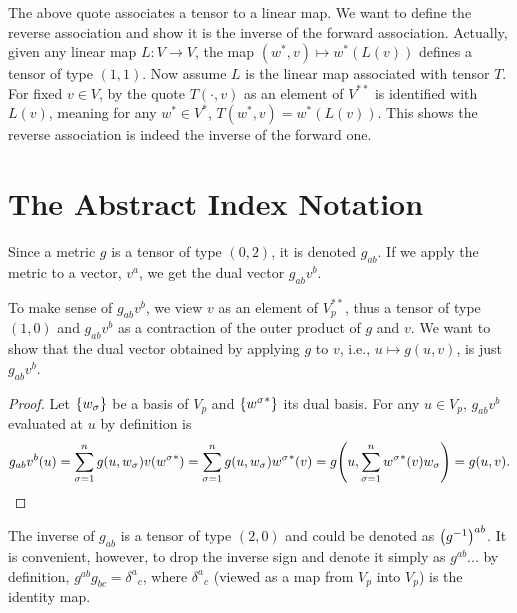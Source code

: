 \documentclass{note}
\numberwithin{equation}{chapter}
\begin{document}
The above quote associates a tensor to a linear map. We want to define the
reverse association and show it is the inverse of the forward association.
Actually, given any linear map $L\colon V \to V$, the map $(w^*, v) \mapsto
    w^*(L(v))$ defines a tensor of type $(1,1)$. Now assume $L$ is the linear map
associated with tensor $T$. For fixed $v \in V$, by the quote $T(\cdot,v)$ as
an element of $V^{**}$ is identified with $L(v)$, meaning for any $w^* \in
    V^*$, $T(w^*,v) = w^*(L(v))$. This shows the reverse association is indeed the
inverse of the forward one.

\setcounter{section}{3}
\section{The Abstract Index Notation}


\begin{quotebar}
    Since a metric $g$ is a tensor of type $(0,2)$, it is denoted $g_{ab}$. If we
    apply the metric to a vector, $v^a$, we get the dual vector $g_{ab}v^b$.
\end{quotebar}

To make sense of $g_{ab}v^b$, we view $v$ as an element of $V_p^{**}$, thus a
tensor of type $(1,0)$ and $g_{ab}v^b$ as a contraction of the outer product of
$g$ and $v$. We want to show that the dual vector obtained by applying $g$ to
$v$, i.e., $u \mapsto g(u,v)$, is just $g_{ab}v^b$.
\begin{proof}
    Let $\set{w_\sigma}$ be a basis of $V_p$ and $\set{{w^\sigma}^*}$ its dual
    basis. For any $u \in V_p$, $g_{ab}v^b$ evaluated at $u$ by definition is
    \begin{equation}
        g_{ab}v^b(u) = \sum_{\sigma=1}^n g(u, w_\sigma)v\prn{{w^\sigma}^*} =
        \sum_{\sigma=1}^n g(u, w_\sigma){w^\sigma}^*(v) = g\prn{u, \sum_{\sigma=1}^n
        {w^\sigma}^*(v) w_\sigma} = g(u,v). \label{eq:contraction-technique} \qedhere
    \end{equation}
\end{proof}

\begin{quotebar}
    The inverse of $g_{ab}$ is a tensor of type $(2,0)$ and could be denoted as
    $\prn{g^{-1}}^{ab}$. It is convenient, however, to drop the inverse sign and
    denote it simply as $g^{ab}$... by definition, $g^{ab}g_{bc} = {\delta^a}_c$,
    where ${\delta^a}_c$ (viewed as a map from $V_p$ into $V_p$) is the identity
    map.
\end{quotebar}
\end{document}
